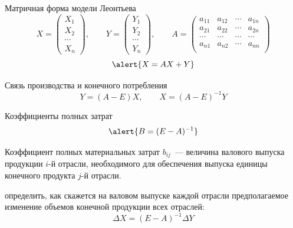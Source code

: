 \documentclass[unicode,11pt,notheorems,xcolor=table]{beamer}
\begin{document}
\begin{frame}{Матричная форма модели Леонтьева}
	$$ 
		X = \begin{pmatrix}
			X_{1} \\ X_{2} \\\cdots\\ X_{n}
		\end{pmatrix},
		\qquad
		Y = \begin{pmatrix}
			Y_{1} \\ Y_{2} \\\cdots\\ Y_{n}
		\end{pmatrix},	
		\qquad
		A= \begin{pmatrix}
			a_{11} & a_{12} &\cdots & a_{1n}\\
			a_{21} & a_{22} &\cdots & a_{2n}\\
			\cdots & \cdots & \cdots & \cdots\\
			a_{n1} & a_{n2} &\cdots & a_{nn}\\
		\end{pmatrix}
	$$
	$$
	\alert{X=AX+Y}		
	$$
	
	
	\bigskip
	\begin{block}{Связь производства и конечного потребления}
		$$
			Y=(A-E)X,\qquad  X=(A-E)^{-1}Y
		$$
			
	\end{block}

\end{frame}
\begin{frame}{Коэффициенты полных затрат}
	$$
		\alert{B = (E - A)^{-1}}
	$$
	

	\alert{Коэффициент полных материальных затрат $b_{ij}$}~--- величина валового выпуска продукции $i$-й отрасли, необходимого для обеспечения выпуска единицы конечного продукта $j$-й отрасли.

	\bigskip
	определить, как скажется на валовом выпуске каждой отрасли предполагаемое изменение объемов конечной продукции всех отраслей:
	$$
		\Delta X = (E-A)^{-1}\Delta Y
	$$
\end{frame}
\end{document}

